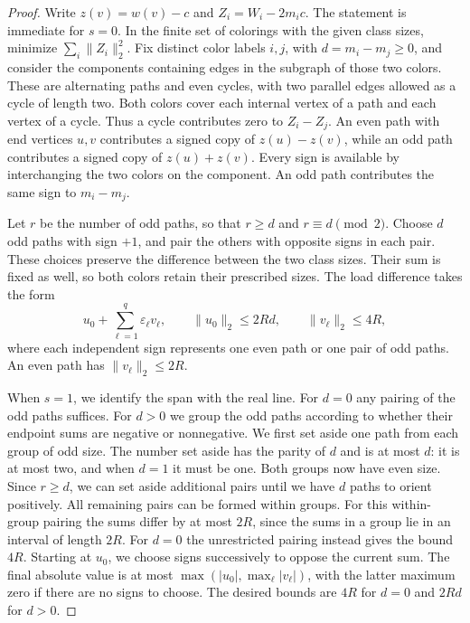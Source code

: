 \documentclass[11pt]{article}
\begin{document}
\begin{proof}
Write \(z(v)=w(v)-c\) and \(Z_i=W_i-2m_i c\). The statement is immediate for \(s=0\). In the finite set of colorings with the given class sizes, minimize \(\sum_i\|Z_i\|_2^2\). Fix distinct color labels \(i,j\), with \(d=m_i-m_j\ge0\), and consider the components containing edges in the subgraph of those two colors. These are alternating paths and even cycles, with two parallel edges allowed as a cycle of length two. Both colors cover each internal vertex of a path and each vertex of a cycle. Thus a cycle contributes zero to \(Z_i-Z_j\). An even path with end vertices \(u,v\) contributes a signed copy of \(z(u)-z(v)\), while an odd path contributes a signed copy of \(z(u)+z(v)\). Every sign is available by interchanging the two colors on the component. An odd path contributes the same sign to \(m_i-m_j\).

Let \(r\) be the number of odd paths, so that \(r\ge d\) and \(r\equiv d\pmod 2\). Choose \(d\) odd paths with sign \(+1\), and pair the others with opposite signs in each pair. These choices preserve the difference between the two class sizes. Their sum is fixed as well, so both colors retain their prescribed sizes. The load difference takes the form
\[
  u_0+\sum_{\ell=1}^q \varepsilon_\ell v_\ell,\qquad
  \|u_0\|_2\le 2Rd,\qquad \|v_\ell\|_2\le4R,
\]
where each independent sign represents one even path or one pair of odd paths. An even path has \(\|v_\ell\|_2\le2R\).

When \(s=1\), we identify the span with the real line. For \(d=0\) any pairing of the odd paths suffices. For \(d>0\) we group the odd paths according to whether their endpoint sums are negative or nonnegative. We first set aside one path from each group of odd size. The number set aside has the parity of \(d\) and is at most \(d\): it is at most two, and when \(d=1\) it must be one. Both groups now have even size. Since \(r\ge d\), we can set aside additional pairs until we have \(d\) paths to orient positively. All remaining pairs can be formed within groups. For this within-group pairing the sums differ by at most \(2R\), since the sums in a group lie in an interval of length \(2R\). For \(d=0\) the unrestricted pairing instead gives the bound \(4R\). Starting at \(u_0\), we choose signs successively to oppose the current sum. The final absolute value is at most \(\max(|u_0|,\max_\ell |v_\ell|)\), with the latter maximum zero if there are no signs to choose. The desired bounds are \(4R\) for \(d=0\) and \(2Rd\) for \(d>0\).


\end{proof}
\end{document}
